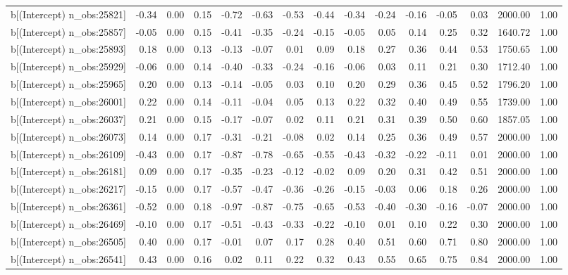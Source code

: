 \begin{table}[ht]
\begin{tabular}{rrrrrrrrrrrrrrr}
  b[(Intercept) n\_obs:25821] & -0.34 & 0.00 & 0.15 & -0.72 & -0.63 & -0.53 & -0.44 & -0.34 & -0.24 & -0.16 & -0.05 & 0.03 & 2000.00 & 1.00 \\ 
  b[(Intercept) n\_obs:25857] & -0.05 & 0.00 & 0.15 & -0.41 & -0.35 & -0.24 & -0.15 & -0.05 & 0.05 & 0.14 & 0.25 & 0.32 & 1640.72 & 1.00 \\ 
  b[(Intercept) n\_obs:25893] & 0.18 & 0.00 & 0.13 & -0.13 & -0.07 & 0.01 & 0.09 & 0.18 & 0.27 & 0.36 & 0.44 & 0.53 & 1750.65 & 1.00 \\ 
  b[(Intercept) n\_obs:25929] & -0.06 & 0.00 & 0.14 & -0.40 & -0.33 & -0.24 & -0.16 & -0.06 & 0.03 & 0.11 & 0.21 & 0.30 & 1712.40 & 1.00 \\ 
  b[(Intercept) n\_obs:25965] & 0.20 & 0.00 & 0.13 & -0.14 & -0.05 & 0.03 & 0.10 & 0.20 & 0.29 & 0.36 & 0.45 & 0.52 & 1796.20 & 1.00 \\ 
  b[(Intercept) n\_obs:26001] & 0.22 & 0.00 & 0.14 & -0.11 & -0.04 & 0.05 & 0.13 & 0.22 & 0.32 & 0.40 & 0.49 & 0.55 & 1739.00 & 1.00 \\ 
  b[(Intercept) n\_obs:26037] & 0.21 & 0.00 & 0.15 & -0.17 & -0.07 & 0.02 & 0.11 & 0.21 & 0.31 & 0.39 & 0.50 & 0.60 & 1857.05 & 1.00 \\ 
  b[(Intercept) n\_obs:26073] & 0.14 & 0.00 & 0.17 & -0.31 & -0.21 & -0.08 & 0.02 & 0.14 & 0.25 & 0.36 & 0.49 & 0.57 & 2000.00 & 1.00 \\ 
  b[(Intercept) n\_obs:26109] & -0.43 & 0.00 & 0.17 & -0.87 & -0.78 & -0.65 & -0.55 & -0.43 & -0.32 & -0.22 & -0.11 & 0.01 & 2000.00 & 1.00 \\ 
  b[(Intercept) n\_obs:26181] & 0.09 & 0.00 & 0.17 & -0.35 & -0.23 & -0.12 & -0.02 & 0.09 & 0.20 & 0.31 & 0.42 & 0.51 & 2000.00 & 1.00 \\ 
  b[(Intercept) n\_obs:26217] & -0.15 & 0.00 & 0.17 & -0.57 & -0.47 & -0.36 & -0.26 & -0.15 & -0.03 & 0.06 & 0.18 & 0.26 & 2000.00 & 1.00 \\ 
  b[(Intercept) n\_obs:26361] & -0.52 & 0.00 & 0.18 & -0.97 & -0.87 & -0.75 & -0.65 & -0.53 & -0.40 & -0.30 & -0.16 & -0.07 & 2000.00 & 1.00 \\ 
  b[(Intercept) n\_obs:26469] & -0.10 & 0.00 & 0.17 & -0.51 & -0.43 & -0.33 & -0.22 & -0.10 & 0.01 & 0.10 & 0.22 & 0.30 & 2000.00 & 1.00 \\ 
  b[(Intercept) n\_obs:26505] & 0.40 & 0.00 & 0.17 & -0.01 & 0.07 & 0.17 & 0.28 & 0.40 & 0.51 & 0.60 & 0.71 & 0.80 & 2000.00 & 1.00 \\ 
  b[(Intercept) n\_obs:26541] & 0.43 & 0.00 & 0.16 & 0.02 & 0.11 & 0.22 & 0.32 & 0.43 & 0.55 & 0.65 & 0.75 & 0.84 & 2000.00 & 1.00 \\ 

\end{tabular}
\end{table}
